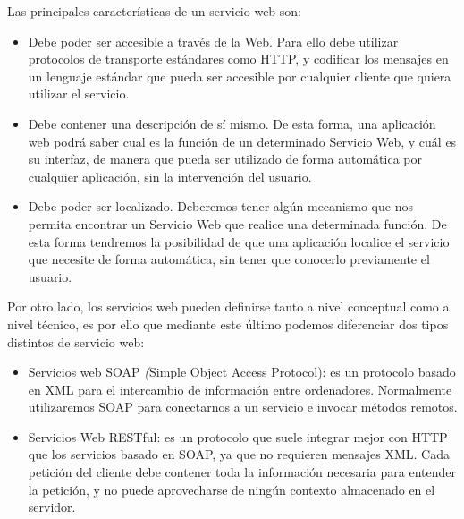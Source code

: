 Las principales características de un servicio web son:
\citep{TorresJoaquin2017SC}


\begin{itemize}
\item Debe poder ser accesible a través de la Web. Para ello debe utilizar protocolos de transporte estándares como HTTP, y codificar los mensajes en un lenguaje estándar que pueda ser accesible por cualquier cliente que quiera utilizar el servicio. 
\item Debe contener una descripción de sí mismo. De esta forma, una aplicación web podrá saber cual es la función de un determinado Servicio Web, y cuál es su interfaz, de manera que pueda ser utilizado de forma automática por cualquier aplicación, sin la intervención del usuario.
\item Debe poder ser localizado. Deberemos tener algún mecanismo que nos permita encontrar un Servicio Web que realice una determinada función. De esta forma tendremos la posibilidad de que una aplicación localice el servicio que necesite de forma automática, sin tener que conocerlo previamente el usuario.
\end{itemize}

Por otro lado, los servicios web pueden definirse tanto a nivel conceptual como a nivel técnico, es por ello que mediante este último podemos diferenciar dos tipos distintos de servicio web:
\begin{itemize}
	\item Servicios web SOAP  \textit({Simple Object Access Protocol}): es un protocolo basado en XML para el intercambio de información entre ordenadores. Normalmente utilizaremos SOAP para conectarnos a un servicio e invocar métodos remotos.
	\item Servicios Web RESTful: es un protocolo que suele integrar mejor con HTTP que los servicios basado en SOAP, ya que no requieren mensajes XML. Cada petición del cliente debe contener toda la información necesaria para entender la petición, y no puede aprovecharse de ningún contexto almacenado en el servidor.
	
\end{itemize}

